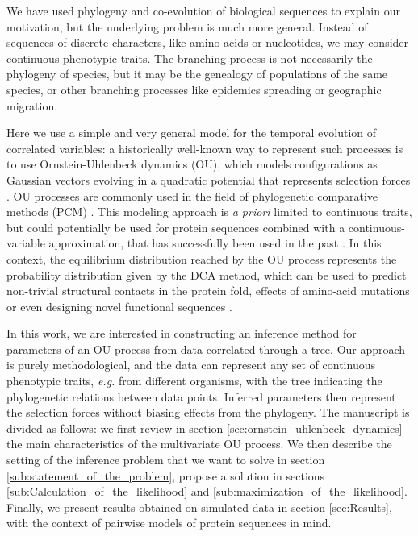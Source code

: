 \documentclass[preprint,amsmath,amssymb,superscriptaddress,showpacs,pre]{revtex4-1}
\begin{document}
We have used phylogeny and co-evolution of biological sequences to explain our motivation, but the underlying problem is much more general. Instead of sequences of discrete characters, like amino acids or nucleotides, we may consider continuous phenotypic traits. The branching process is not necessarily the phylogeny of species, but it may be the genealogy of populations of the same species, or other branching processes like epidemics spreading or geographic migration.

Here we use a simple and very general model for the temporal evolution of correlated variables: a historically well-known way to represent such processes is to use Ornstein-Uhlenbeck dynamics (OU), which models configurations as Gaussian vectors evolving in a quadratic potential that represents selection forces \cite{uhlenbeck_theory_1930, felsenstein_phylogenies_1988, hansen_stabilizing_1997}.
OU processes are commonly used in the field of phylogenetic comparative methods (PCM) \cite{bartoszek_phylogenetic_2012,mitov_fast_2020}. 
This modeling approach is \emph{a priori} limited to continuous traits, but could potentially be used for protein sequences combined with a continuous-variable approximation, that has successfully been used in the past \cite{jones_psicov_2012,barton_large_2014,baldassi_fast_2014}. 
In this context, the equilibrium distribution reached by the OU process represents the probability distribution given by the DCA method, which can be used to predict non-trivial structural contacts in the protein fold, effects of amino-acid mutations or even designing novel functional sequences \cite{morcos_direct-coupling_2011, figliuzzi_coevolutionary_2016, russ_evolution-based_2020}. 


In this work, we are interested in constructing an inference method for parameters of an OU process from data correlated through a tree.
Our approach is purely methodological, and the data can represent any set of continuous phenotypic traits, \emph{e.g.} from different organisms, with the tree indicating the phylogenetic relations between data points. 
Inferred parameters then represent the selection forces without biasing effects from the phylogeny. 
The manuscript is divided as follows: we first review in section \ref{sec:ornstein_uhlenbeck_dynamics} the main characteristics of the multivariate OU process. 
We then describe the setting of the inference problem that we want to solve in section \ref{sub:statement_of_the_problem}, propose a solution in sections \ref{sub:Calculation_of_the_likelihood} and \ref{sub:maximization_of_the_likelihood}.
Finally, we present results obtained on simulated data in section \ref{sec:Results}, with the context of pairwise models of protein sequences in mind. 
\end{document}
